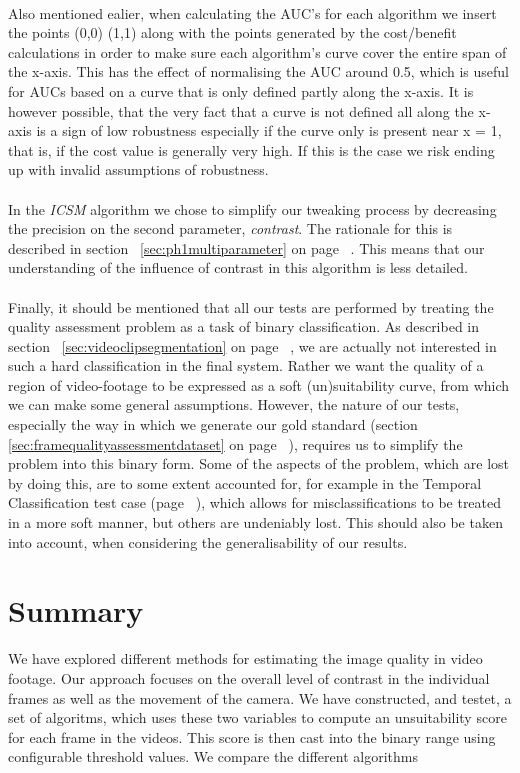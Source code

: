 \\
Also mentioned ealier, when calculating the AUC's for each algorithm we insert the points (0,0) (1,1) along with the points generated by the cost/benefit calculations in order to make sure each algorithm's curve cover the entire span of the x-axis. This has the effect of normalising the AUC around 0.5, which is useful for AUCs based on a curve that is only defined partly along the x-axis. It is however possible, that the very fact that a curve is not defined all along the x-axis is a sign of low robustness especially if the curve only is present near x = 1, that is, if the cost value is generally very high. If this is the case we risk ending up with invalid assumptions of robustness.\\
\\
In the \textit{ICSM} algorithm we chose to simplify our tweaking process by decreasing the precision on the second parameter, \textit{contrast}. The rationale for this is described in section~ \ref{sec:ph1multiparameter} on page ~\pageref{sec:ph1multiparameter}. This means that our understanding of the influence of contrast in this algorithm is less detailed.\\
\\
Finally, it should be mentioned that all our tests are performed by treating the quality assessment problem as a task of binary classification. As described in section~ \ref{sec:videoclipsegmentation} on page ~\pageref{sec:videoclipsegmentation}, we are actually not interested in such a hard classification in the final system. Rather we want the quality of a region of video-footage to be expressed as a soft (un)suitability curve, from which we can make some general assumptions. However, the nature of our tests, especially the way in which we generate our gold standard (section~ \ref{sec:framequalityassessmentdataset} on page ~\pageref{sec:framequalityassessmentdataset}), requires us to simplify the problem into this binary form. Some of the aspects of the problem, which are lost by doing this, are to some extent accounted for, for example in the Temporal Classification test case (page ~\pageref{sec:tctestcase}), which allows for misclassifications to be treated in a more soft manner, but others are undeniably lost. This should also be taken into account, when considering the generalisability of our results.
%
\section{Summary}
%
We have explored different methods for estimating the image quality in video footage. Our approach focuses on the overall level of contrast in the individual frames as well as the movement of the camera. We have constructed, and testet, a set of algoritms, which uses these two variables to compute an unsuitability score for each frame in the videos. This score is then cast into the binary range using configurable threshold values. We compare the different algorithms 
%